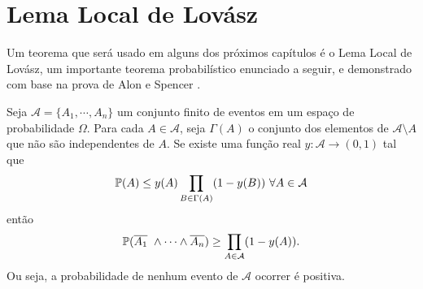 \section{Lema Local de Lovász}

Um teorema que será usado em alguns dos próximos capítulos é o Lema Local de Lovász, um importante teorema probabilístico enunciado a seguir, e demonstrado com base na prova de Alon e Spencer \cite{alon2004probabilistic}.

\begin{teorema}\label{LLL}
Seja $\mathcal{A} = \{A_1, \cdots, A_n\}$ um conjunto finito de eventos em um espaço de probabilidade $\Omega$. Para cada $A\in \mathcal{A}$, seja $\Gamma(A)$ o conjunto dos elementos de $\mathcal{A}\setminus A$ que não são independentes de $A$. Se existe uma função real $y : \mathcal{A} \rightarrow (0,1)$ tal que
\[\mathbb{P}(A)\leq y(A) \prod_{B\in \Gamma(A)}(1-y(B))\ \forall A\in \mathcal{A}\]
então 
\[\mathbb{P}(\overline{A_1}\ \wedge \cdots \wedge \overline{A_n}) \geq \prod_{A\in\mathcal{A}}(1-y(A)).\]
Ou seja, a probabilidade de nenhum evento de $\mathcal{A}$ ocorrer é positiva.
\end{teorema}

